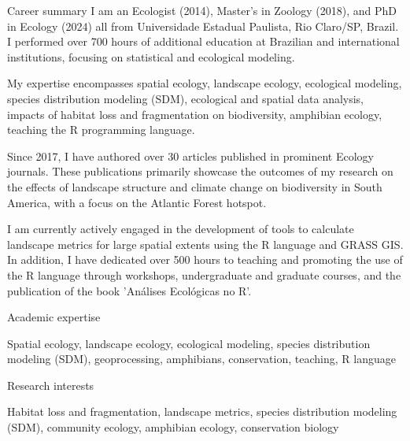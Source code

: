 \documentclass{resume}
\begin{document}

\begin{rSection}{Career summary}
I am an Ecologist (2014), Master's in Zoology (2018), and PhD in Ecology (2024) all from Universidade Estadual Paulista, Rio Claro/SP, Brazil. I performed over 700 hours of additional education at Brazilian and international institutions, focusing on statistical and ecological modeling. 

My expertise encompasses spatial ecology, landscape ecology, ecological modeling, species distribution modeling (SDM), ecological and spatial data analysis, impacts of habitat loss and fragmentation on biodiversity, amphibian ecology, teaching the R programming language. 

Since 2017, I have authored over 30 articles published in prominent Ecology journals. These publications primarily showcase the outcomes of my research on the effects of landscape structure and climate change on biodiversity in South America, with a focus on the Atlantic Forest hotspot.

I am currently actively engaged in the development of tools to calculate landscape metrics for large spatial extents using the R language and GRASS GIS. In addition, I have dedicated over 500 hours to teaching and promoting the use of the R language through workshops, undergraduate and graduate courses, and the publication of the book 'Análises Ecológicas no R'.
\end{rSection}


\begin{rSection}{Academic expertise}

Spatial ecology, landscape ecology, ecological modeling, species distribution modeling (SDM), geoprocessing, amphibians, conservation, teaching, R language

\end{rSection}


\begin{rSection}{Research interests}

Habitat loss and fragmentation, landscape metrics, species distribution modeling (SDM), community ecology, amphibian ecology, conservation biology

\end{rSection}
\end{document}
